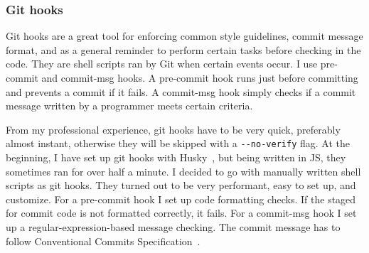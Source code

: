 \subsubsection{Git hooks}\label{sec:git-hooks}

Git hooks are a great tool
for enforcing common style guidelines,
commit message format,
and as a general reminder
to perform certain tasks before checking in the code.
They are shell scripts ran by Git
when certain events occur.
I use pre-commit and commit-msg hooks.
A pre-commit hook runs just before committing
and prevents a commit if it fails.
A commit-msg hook simply checks
if a commit message written by a programmer
meets certain criteria.

From my professional experience,
git hooks have to be very quick,
preferably almost instant,
otherwise they will be skipped
with a \texttt{{-}{-}no-verify} flag.
At the beginning,
I have set up git hooks
with Husky~\cite{typicode_husky_2022},
but being written in \ac{JS},
they sometimes ran for over half a minute.
I decided to go with manually written shell scripts
as git hooks.
They turned out to be very performant,
easy to set up, and customize.
For a pre-commit hook I set up code formatting checks.
If the staged for commit code is not formatted correctly,
it fails.
For a commit-msg hook I set up a regular-expression-based
message checking.
The commit message has to follow
Conventional Commits Specification~\cite{petrungaro_conventional_2019}.
